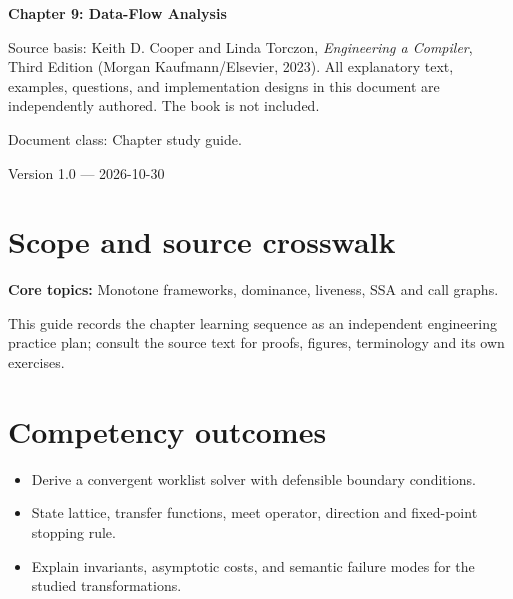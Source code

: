 \documentclass[10pt,letterpaper]{article}
\begin{document}
\begin{titlepage}
\centering\vspace*{1.0in}
{\Huge\bfseries\textcolor{CompilerBlue}{Chapter 9: Data-Flow Analysis}\par}
\vspace{.22in}{\Large Critical reading, original exercises, evidence and review\par}
\vspace{.4in}{\large Compiler Engineering Documentation Suite\par}
\vfill
\begin{minipage}{.86\linewidth}\small
Source basis: Keith D. Cooper and Linda Torczon, \emph{Engineering a Compiler}, Third Edition (Morgan Kaufmann/Elsevier, 2023). All explanatory text, examples, questions, and implementation designs in this document are independently authored. The book is not included.\par\medskip
Document class: Chapter study guide.
\end{minipage}
\vfill\textcolor{CompilerGray}{Version 1.0 --- 2026-10-30}\par
\end{titlepage}
\tableofcontents\clearpage
\section{Scope and source crosswalk}
\textbf{Core topics:} Monotone frameworks, dominance, liveness, SSA and call graphs.

This guide records the chapter learning sequence as an independent engineering practice plan; consult the source text for proofs, figures, terminology and its own exercises.

\section{Competency outcomes}
\begin{itemize}
\item Derive a convergent worklist solver with defensible boundary conditions.
\item State lattice, transfer functions, meet operator, direction and fixed-point stopping rule.
\item Explain invariants, asymptotic costs, and semantic failure modes for the studied transformations.
\end{itemize}
\end{document}
